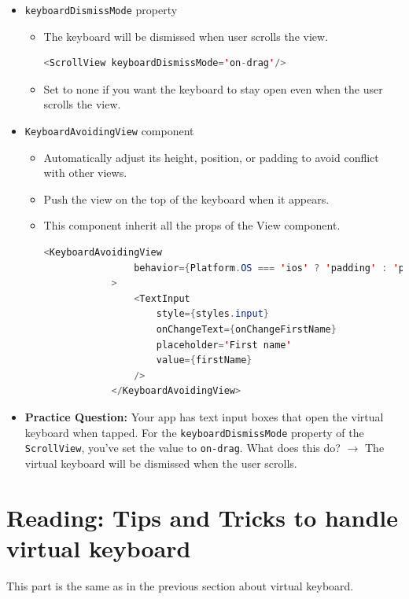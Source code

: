 \begin{itemize}
    \item \texttt{keyboardDismissMode} property
    \begin{itemize}
        \item The keyboard will be dismissed when user scrolls the view.
        \begin{lstlisting}[language=Java, numbers=none]
            <ScrollView keyboardDismissMode='on-drag'/>
        \end{lstlisting}
        \item Set to none if you want the keyboard to stay open even when the user scrolls the view.
    \end{itemize}

    \item \texttt{KeyboardAvoidingView} component
    \begin{itemize}
        \item Automatically adjust its height, position, or padding to avoid conflict with other views.
        \item Push the view on the top of the keyboard when it appears.
        \item This component inherit all the props of the View component.
        \begin{lstlisting}[language=Java, numbers=none]
            <KeyboardAvoidingView
                behavior={Platform.OS === 'ios' ? 'padding' : 'position'}
            >
                <TextInput
                    style={styles.input}
                    onChangeText={onChangeFirstName}
                    placeholder='First name'
                    value={firstName}
                />
            </KeyboardAvoidingView>
        \end{lstlisting}
    \end{itemize}

    \item \textbf{Practice Question:} Your app has text input boxes that open the virtual keyboard when tapped. For the \texttt{keyboardDismissMode} property of the \texttt{ScrollView}, you’ve set the value to \texttt{on-drag}. What does this do?   
    $\rightarrow$ The virtual keyboard will be dismissed when the user scrolls.   
\end{itemize}

\section{Reading: Tips and Tricks to handle virtual keyboard}
This part is the same as in the previous section about virtual keyboard.

